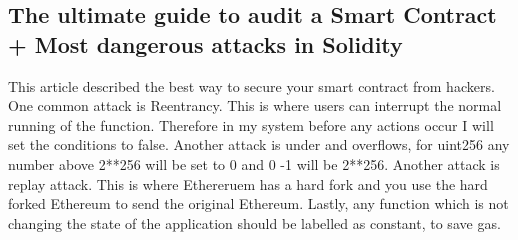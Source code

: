 \subsection{The ultimate guide to audit a Smart Contract + Most dangerous attacks in Solidity  \cite{Grincalaitis:2017:pdflatex}}
This article described the best way to secure your smart contract from hackers. One common attack is Reentrancy. This is where users can interrupt the normal running of the function.  Therefore in my system before any actions occur I will set the conditions to false. Another attack is under and overflows, for uint256 any number above 2**256 will be set to 0 and 0 -1 will be 2**256. Another attack is replay attack. This is where Ethereruem has a hard fork and you use the hard forked Ethereum to send the original Ethereum. Lastly, any function which is not changing the state of the application should be labelled as constant, to save gas.